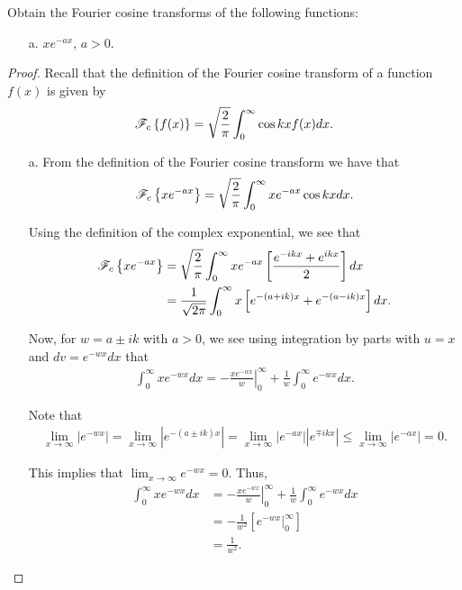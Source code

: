 \begin{problem}{2.14}
  Obtain the Fourier cosine transforms of the following functions:
  \begin{enumerate}
    \item[a.] $x e^{-a x}$, $a > 0$.
  \end{enumerate}
\end{problem}

\begin{proof}
  Recall that the definition of the Fourier cosine transform of a function $f(x)$
  is given by
  \begin{align*}
    \mathscr{F}_c\left\{ {f(x)} \right\} = \sqrt{\frac{2}{\pi}} \int_0^\infty \cos kx f(x) dx.
  \end{align*}
  \begin{enumerate}
    \item[a.] From the definition of the Fourier cosine transform we have that
      \begin{align*}
        \mathscr{F}_c\left\{ {xe^{-ax}} \right\} = \sqrt{\frac{2}{\pi}} \int_0^\infty x e^{-ax}\cos kx  dx.
      \end{align*}

      Using the definition of the complex exponential, we see that
      \begin{align*}
        \mathscr{F}_c\left\{ {xe^{-ax}} \right\}
        &= \sqrt{\frac{2}{\pi}} \int_0^\infty x e^{-ax}\left[\frac{e^{-ikx} + e^{ikx}}{2}\right]  dx \\
        &= \frac{1}{\sqrt{2\pi}} \int_0^\infty x \left[e^{-(a+ik)x} + e^{-(a-ik)x}\right]  dx.
      \end{align*}


      Now, for $w = a \pm ik$ with $a>0$, we see using integration by parts with $u = x$ and $dv =e^{-wx}dx$ that
      \begin{align*}
        \int_{0}^\infty x e^{-wx}dx = \left.-\frac{xe^{-wx}}{w}\right\rvert_{0}^\infty + \frac{1}{w} \int_0^\infty e^{-wx} dx.
      \end{align*}

      Note that
      \begin{align*}
        \lim_{x\to\infty} \left| e^{-wx} \right| = \lim_{x\to\infty} \left|e^{-(a\pm ik)x}\right| = \lim_{x\to\infty} \left|e^{-ax}\right|  \left|e^{\mp ikx}\right| \leq \lim_{x\to\infty} \left|e^{-ax}\right|  = 0.
      \end{align*}

      This implies that $\lim_{x\to\infty} e^{-wx} = 0$. Thus,
      \begin{align*}
        \int_{0}^\infty x e^{-wx}dx &= \left.-\frac{xe^{-wx}}{w}\right\rvert_{0}^\infty + \frac{1}{w} \int_0^\infty e^{-wx} dx \\
        &=  -\frac{1}{w^2} \left[ \left.e^{-wx}\right\rvert_{0}^{\infty} \right] \\
        &= \frac{1}{w^2}.
      \end{align*}


\end{enumerate}
\end{proof}
